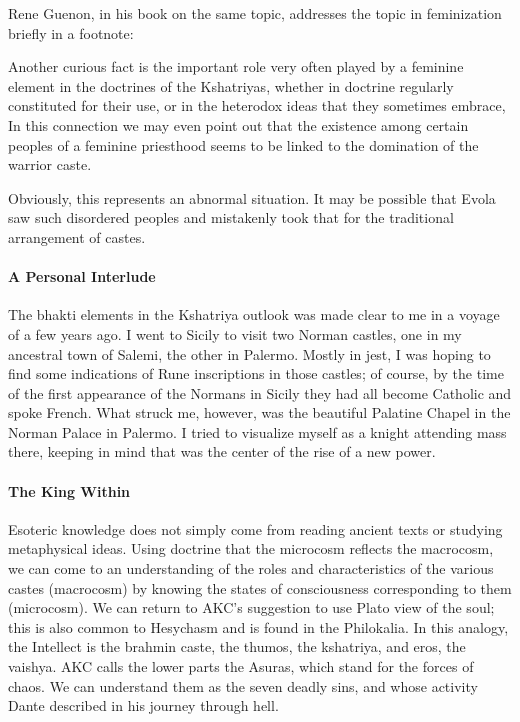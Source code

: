Rene Guenon, in his book on the same topic, addresses the topic in feminization briefly in a footnote:

\begin{quotex}
Another curious fact is the important role very often played by a feminine element in the doctrines of the Kshatriyas, whether in doctrine regularly constituted for their use, or in the heterodox ideas that they sometimes embrace, In this connection we may even point out that the existence among certain peoples of a feminine priesthood seems to be linked to the domination of the warrior caste.
\end{quotex}


Obviously, this represents an abnormal situation. It may be possible that Evola saw such disordered peoples and mistakenly took that for the traditional arrangement of castes.

\paragraph{A Personal Interlude}

The bhakti elements in the Kshatriya outlook was made clear to me in a voyage of a few years ago. I went to Sicily to visit two Norman castles, one in my ancestral town of Salemi, the other in Palermo. Mostly in jest, I was hoping to find some indications of Rune inscriptions in those castles; of course, by the time of the first appearance of the Normans in Sicily they had all become Catholic and spoke French. What struck me, however, was the beautiful Palatine Chapel in the Norman Palace in Palermo. I tried to visualize myself as a knight attending mass there, keeping in mind that was the center of the rise of a new power.

\paragraph{The King Within}


Esoteric knowledge does not simply come from reading ancient texts or studying metaphysical ideas. Using doctrine that the microcosm reflects the macrocosm, we can come to an understanding of the roles and characteristics of the various castes (macrocosm) by knowing the states of consciousness corresponding to them (microcosm). We can return to AKC's suggestion to use Plato view of the soul; this is also common to Hesychasm and is found in the Philokalia. In this analogy, the Intellect is the brahmin caste, the thumos, the kshatriya, and eros, the vaishya. AKC calls the lower parts the Asuras, which stand for the forces of chaos. We can understand them as the seven deadly sins, and whose activity Dante described in his journey through hell.

